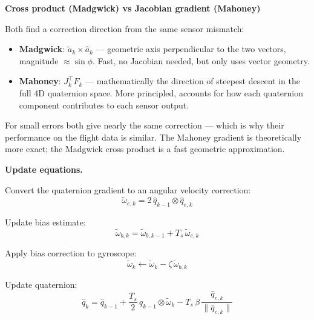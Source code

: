 \documentclass[12pt, a4paper]{article}
\begin{document}
\begin{notebox}
  \textbf{Cross product (Madgwick) vs Jacobian gradient (Mahoney)}

  Both find a correction direction from the same sensor mismatch:

  \begin{itemize}[leftmargin=1.2em, itemsep=3pt]
    \item \textbf{Madgwick}: $\tilde{a}_k \times \hat{a}_k$ --- geometric
      axis perpendicular to the two vectors, magnitude $\approx \sin\phi$.
      Fast, no Jacobian needed, but only uses vector geometry.

    \item \textbf{Mahoney}: $J_k^\top F_k$ --- mathematically the direction
      of steepest descent in the full 4D quaternion space.
      More principled, accounts for how each quaternion component
      contributes to each sensor output.
  \end{itemize}

  For small errors both give nearly the same correction --- which is why
  their performance on the flight data is similar.
  The Mahoney gradient is theoretically more exact; the Madgwick cross
  product is a fast geometric approximation.
\end{notebox}

\textbf{Update equations.}

Convert the quaternion gradient to an angular velocity correction:
\[
  \tilde{\omega}_{e,k} = 2\,\hat{q}_{k-1} \otimes \hat{q}_{e,k}
\]

Update bias estimate:
\[
  \tilde{\omega}_{b,k} = \tilde{\omega}_{b,k-1} + T_s\,\tilde{\omega}_{e,k}
\]

Apply bias correction to gyroscope:
\[
  \tilde{\omega}_k \leftarrow \tilde{\omega}_k - \zeta\,\tilde{\omega}_{b,k}
\]

Update quaternion:
\[
  \hat{q}_k
  = \hat{q}_{k-1}
  + \frac{T_s}{2}\,\hat{q}_{k-1} \otimes \tilde{\omega}_k
  - T_s\,\beta\,\frac{\hat{q}_{e,k}}{\|\hat{q}_{e,k}\|}
\]
\end{document}
